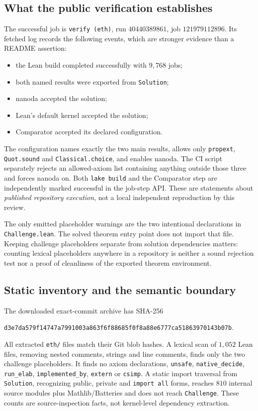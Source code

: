 \documentclass[11pt,letterpaper]{article}
\theoremstyle{remark}\newtheorem{remark}[theorem]{Remark}
\begin{document}
\subsection{What the public verification establishes}
The successful job is \texttt{verify (eth)}, run $40440389861$, job $121979112896$. Its fetched log records the following events, which are stronger evidence than a README assertion:
\begin{itemize}
\item the Lean build completed successfully with $9{,}768$ jobs;
\item both named results were exported from \texttt{Solution};
\item nanoda accepted the solution;
\item Lean's default kernel accepted the solution;
\item Comparator accepted its declared configuration.
\end{itemize}
The configuration names exactly the two main results, allows only \texttt{propext}, \texttt{Quot.sound} and \texttt{Classical.choice}, and enables nanoda. The CI script separately rejects an allowed-axiom list containing anything outside those three and forces nanoda on. Both \texttt{lake build} and the Comparator step are independently marked successful in the job-step API. These are statements about \emph{published repository execution}, not a local independent reproduction by this review.

The only emitted placeholder warnings are the two intentional declarations in \texttt{Challenge.lean}. The solved theorem entry point does not import that file. Keeping challenge placeholders separate from solution dependencies matters: counting lexical placeholders anywhere in a repository is neither a sound rejection test nor a proof of cleanliness of the exported theorem environment.

\subsection{Static inventory and the semantic boundary}
The downloaded exact-commit archive has SHA-256
\begin{center}\scriptsize\texttt{d3e7da579f14747a7991003a863f6f88685f0f8a88e6777ca51863970143b07b}.\end{center}
All extracted \texttt{eth/} files match their Git blob hashes. A lexical scan of $1{,}052$ Lean files, removing nested comments, strings and line comments, finds only the two challenge placeholders. It finds no axiom declarations, \texttt{unsafe}, \texttt{native\_decide}, \texttt{run\_elab}, \texttt{implemented\_by}, \texttt{extern} or \texttt{csimp}. A static import traversal from \texttt{Solution}, recognizing public, private and \texttt{import all} forms, reaches $810$ internal source modules plus Mathlib/Batteries and does not reach \texttt{Challenge}. These counts are source-inspection facts, not kernel-level dependency extraction.
\end{document}
